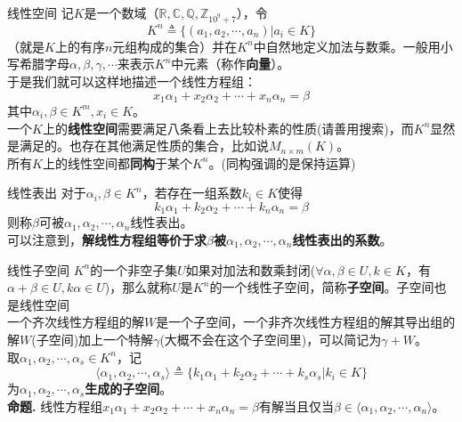 \documentclass{beamer}
\begin{document}
\begin{frame}{线性空间}
	记$K$是一个数域（$\mathbb R, \mathbb C, \mathbb Q, \mathbb Z_{10^9+7}$），令$$K^n \triangleq \{(a_1, a_2, \cdots, a_n) | a_i \in K\}$$
	（就是$K$上的有序$n$元组构成的集合）并在$K^n$中自然地定义加法与数乘。一般用小写希腊字母$\alpha, \beta, \gamma, \cdots$来表示$K^n$中元素（称作\textbf{向量}）。\\
	
	于是我们就可以这样地描述一个线性方程组：$$x_1\alpha_ 1+ x_2\alpha_2 + \cdots + x_n\alpha_n = \beta$$其中$\alpha_i, \beta \in K^m, x_i \in K$。\\
	
	一个$K$上的\textbf{线性空间}需要满足八条看上去比较朴素的性质(请善用搜索)，而$K^n$显然是满足的。也存在其他满足性质的集合，比如说$M_{n\times m}(K)$。\\
	
	所有$K$上的线性空间都\textbf{同构}于某个$K^n$。(同构强调的是保持运算)
\end{frame}
\begin{frame}{线性表出}
	对于$\alpha_i, \beta \in K^n$，若存在一组系数$k_i \in K$使得$$k_1\alpha_1 + k_2\alpha_2 + \cdots + k_n\alpha_n = \beta$$
	则称$\beta$可被$\alpha_1, \alpha_2, \cdots, \alpha_n$线性表出。\\
	
	可以注意到，\textbf{解线性方程组等价于求$\beta$被$\alpha_1, \alpha_2, \cdots, \alpha_n$线性表出的系数}。
\end{frame}
\begin{frame}{线性子空间}
	$K^n$的一个非空子集$U$如果对加法和数乘封闭($\forall \alpha, \beta \in U, k \in K$，有$\alpha + \beta \in U, k\alpha \in U$)，那么就称$U$是$K^n$的一个线性子空间，简称\textbf{子空间}。子空间也是线性空间\\
	
	一个齐次线性方程组的解$W$是一个子空间，一个非齐次线性方程组的解其导出组的解$W$(子空间)加上一个特解$\gamma$(大概不会在这个子空间里)，可以简记为$\gamma + W$。\\
	
	取$\alpha_1, \alpha_2, \cdots, \alpha_s \in K^n$，记$$\langle\alpha_1, \alpha_2, \cdots, \alpha_s\rangle \triangleq \{k_1\alpha_1 + k_2\alpha_2 + \cdots + k_s\alpha_s | k_i \in K\}$$为$\alpha_1, \alpha_2, \cdots, \alpha_s$\textbf{生成的子空间}。\\
	
	\textbf{命题. }线性方程组$x_1\alpha_ 1+ x_2\alpha_2 + \cdots + x_n\alpha_n = \beta$有解当且仅当$\beta \in \langle\alpha_1, \alpha_2, \cdots, \alpha_n\rangle$。
\end{frame}
\end{document}
